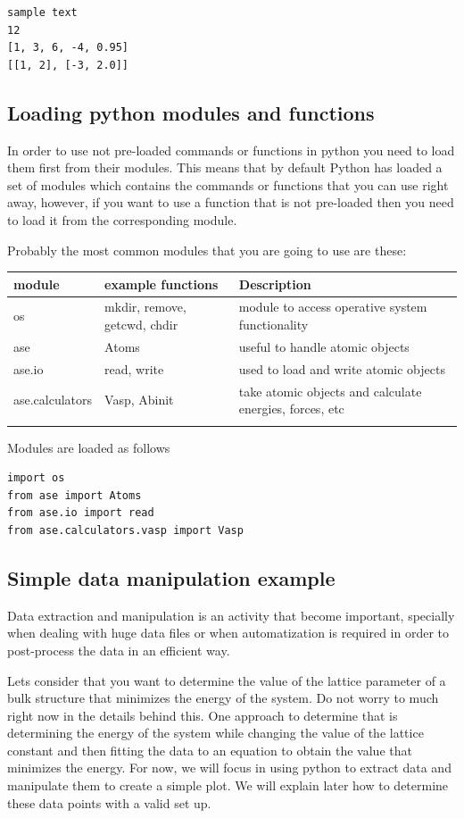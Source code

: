 \documentclass[11pt]{article}
\begin{document}
\begin{verbatim}
sample text
12
[1, 3, 6, -4, 0.95]
[[1, 2], [-3, 2.0]]
\end{verbatim}

\subsection{Loading python modules and functions}
\label{sec-4-3}
In order to use not pre-loaded commands or functions in python you need to load them first from their modules. This means that by default Python has loaded a set of modules which contains the commands or functions that you can use right away, however, if you want to use a function that is not pre-loaded then you need to load it from the corresponding module. 

Probably the most common modules that you are going to use are these:
\begin{center}
\begin{tabular}{lll}
module & example functions & Description\\
\hline
os & mkdir, remove, getcwd, chdir & module to access operative system functionality\\
ase & Atoms & useful to handle atomic objects\\
ase.io & read, write & used to load and write atomic objects\\
ase.calculators & Vasp, Abinit & take atomic objects and calculate energies, forces, etc\\
 &  & \\
\end{tabular}
\end{center}

Modules are loaded as follows
\begin{verbatim}
import os
from ase import Atoms
from ase.io import read
from ase.calculators.vasp import Vasp
\end{verbatim}

\subsection{Simple data manipulation example}
\label{sec-4-4}
Data extraction and manipulation is an activity that become important, specially when dealing with huge data files or when automatization is required in order to post-process the data in an efficient way.

Lets consider that you want to determine the value of the lattice parameter of a bulk structure that minimizes the energy of the system. Do not worry to much right now in the details behind this. One approach to determine that is determining the energy of the system while changing the value of the lattice constant and then fitting the data to an equation to obtain the value that minimizes the energy. For now, we will focus in using python to extract data and manipulate them to create a simple plot. We will explain later how to determine these data points with a valid set up.
\end{document}
